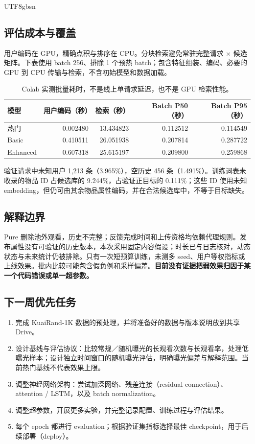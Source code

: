 \documentclass[10pt,a4paper]{article}
\begin{document}
\begin{CJK*}{UTF8}{gbsn}
\subsection{评估成本与覆盖}
用户编码在 GPU，精确点积与排序在 CPU。分块检索避免常驻完整请求 $\times$ 候选矩阵。下表使用 batch 256、排除 1 个预热 batch；包含特征组装、编码、必要的 GPU 到 CPU 传输与检索，不含初始模型和数据加载。
\begin{table}[H]\centering\small
\begin{tabular}{lrrrr}\toprule
模型 & 用户编码（秒） & 检索（秒） & Batch P50（秒） & Batch P95（秒）\\\midrule
热门 & 0.002480 & 13.434823 & 0.112512 & 0.114549\\
Basic & 0.410511 & 26.051938 & 0.207814 & 0.287722\\
Enhanced & 0.607318 & 25.615197 & 0.209800 & 0.259868\\\bottomrule
\end{tabular}\caption{Colab 实测批量耗时，不是线上单请求延迟，也不是 GPU 检索性能。}\end{table}
验证请求中未知用户 1,213 条（3.965\%），空历史 456 条（1.491\%）。训练词表未收录的物品 ID 占候选库的 9.244\%，占验证正目标的 0.111\%；这些 ID 使用未知 embedding，但仍可由其余物品属性编码，并在合法候选库中，不等于目标缺失。

\subsection{解释边界}
Pure 删除池外观看，历史不完整；反馈完成时间和上传资格均依赖代理规则。发布属性没有可验证的历史版本，本次采用固定内容假设；时长已与日志核对，动态状态与未来统计仍被排除。只有一次短预算训练，未测多 seed、用户等权指标或上线效果。批内比较可能包含假负例和采样偏差。\textbf{目前没有证据把弱效果归因于某一个代码错误或单一超参数。}

\subsection{下一周优先任务}
\begin{enumerate}\setlength{\itemsep}{2pt}\setlength{\parsep}{0pt}
\item 完成 KuaiRand-1K 数据的预处理，并将准备好的数据与版本说明放到共享 Drive。
\item 设计基线与评估协议：比较常规／随机曝光的长观看次数与长观看率，处理低曝光样本；设计独立时间窗口的随机曝光评估，明确曝光偏差与解释范围。当前热门基线不代表效果上限。
\item 调整神经网络架构：尝试加深网络、残差连接（residual connection）、attention / LSTM，以及 batch normalization。
\item 调整超参数，开展更多实验，并完整记录配置、训练过程与评估结果。
\item 每个 epoch 都进行 evaluation；根据验证集指标选择最佳 checkpoint，用于后续部署（deploy）。
\end{enumerate}


\end{CJK*}
\end{document}
